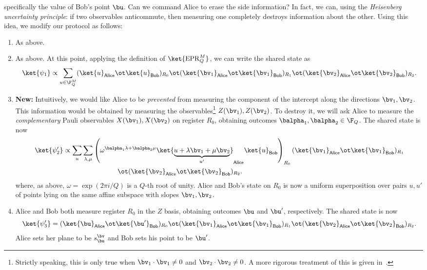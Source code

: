 \documentclass[11pt]{article}
\newcommand{\epr}{\mathrm{EPR}}
\newcommand{\reg}[1]{{\mathsf{#1}}}
\begin{document}
  specifically the value of Bob's point $\bu$. Can we command Alice to
  erase the side information? In fact, we can, using the
  \emph{Heisenberg uncertainty principle}: if two observables
  anticommute, then measuring one completely destroys information
  about the other. Using this idea, we modify our protocol as follows:
  \begin{enumerate}
  \item As above.
  \item As above. At this point,  applying the definition of
    $\ket{\epr_Q^M}$, we can write the shared state as
    \[ \ket{\psi_1} \propto \sum_{u \in \F_Q^M} (\ket{u}_{\reg{Alice}}
      \ot \ket{u}_{\reg{Bob}})_{R_0} \ot
      (\ket{\bv_1}_{\reg{Alice}} \ot \ket{\bv_1}_{\reg{Bob}})_{R_1} \ot
      (\ket{\bv_2}_{\reg{Alice}} \ot \ket{\bv_2}_{\reg{Bob}})_{R_2}. \]
  \item {\bf New:} Intuitively, we would like Alice to be
    \emph{prevented} from measuring the component of the intercept
    along the directions $\bv_1, \bv_2$. This information would be
    obtained by measuring the observables\footnote{Strictly speaking,
      this is only true when $\bv_1 \cdot \bv_1 \neq 0$ and $\bv_2
      \cdot \bv_2 \neq 0$. A more rigorous treatment of this is given
      in~.} $Z(\bv_1), Z(\bv_2)$. To
    destroy it, we will ask Alice to measure the \emph{complementary}
    Pauli observables $X(\bv_1),
    X(\bv_2)$ on register $R_0$, obtaining outcomes $\balpha_1, \balpha_2
    \in \F_Q$. The shared state is now
    \begin{align*}
      \ket{\psi_2'} &\propto \sum_{u} \sum_{\lambda, \mu} \left(
                      \omega^{\balpha_1 \lambda + \balpha_2 \mu}
          \ket{\underbrace{u + \lambda \bv_1 + \mu \bv_2}_{u'}}_{\reg{Alice}}
        \ket{u}_{\reg{Bob}}\right)_{R_0} 
            (\ket{\bv_1}_{\reg{Alice}} \ot
                      \ket{\bv_1}_{\reg{Bob}})_{R_1} \\
      &\qquad\qquad\qquad\qquad\ot
        (\ket{\bv_2}_{\reg{Alice}} \ot \ket{\bv_2}_{\reg{Bob}})_{R_2}.
    \end{align*}
    where, as above, $\omega = \exp(2\pi i / Q)$ is a $Q$-th root of
    unity. Alice and Bob's state on $R_0$ is now a uniform 
    superposition over pairs $u, u'$ of points lying on the same
    affine subspace with slopes $\bv_1, \bv_2$.
  \item Alice and Bob both measure register $R_0$ in the $Z$ basis,
    obtaining outcomes $\bu$ and $\bu'$, respectively. The shared
    state is now
        \[ \ket{\psi_3'} = (\ket{\bu}_{\reg{Alice}} \ot
      \ket{\bu'}_{\reg{Bob}})_{R_0}    \ot  (\ket{\bv_1}_{\reg{Alice}} \ot \ket{\bv_1}_{\reg{Bob}})_{R_1} \ot
      (\ket{\bv_2}_{\reg{Alice}} \ot \ket{\bv_2}_{\reg{Bob}})_{R_2}. \]
Alice sets her
    plane to be $s^{\bv}_{\bu}$ and Bob sets his point to be
    $\bu'$. 
  \end{enumerate}
\end{document}
